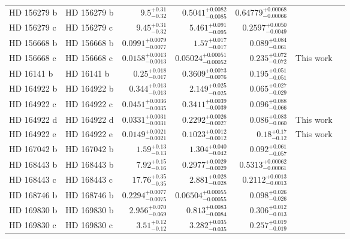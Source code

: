 \begin{longtable*}{llrrrrr}
HD 156279 b & HD 156279 b & $9.5^{+0.31}_{-0.32}$ & $0.5041^{+0.0082}_{-0.0085}$ & $0.64779^{+0.00068}_{-0.00066}$ & \cite{Diaz12} & \\ 
HD 156279 c & HD 156279 c & $9.45^{+0.31}_{-0.32}$ & $5.461^{+0.091}_{-0.095}$ & $0.2597^{+0.0050}_{-0.0049}$ & \cite{Bryan16} & \\ 
HD 156668 b & HD 156668 b & $0.0991^{+0.0079}_{-0.0077}$ & $1.57^{+0.017}_{-0.017}$ & $0.089^{+0.084}_{-0.061}$ & \cite{Howard11} & \\ 
HD 156668 c & HD 156668 c & $0.0158^{+0.0013}_{-0.0013}$ & $0.05024^{+0.00051}_{-0.00052}$ & $0.235^{+0.072}_{-0.072}$ & This work & \\ 
HD 16141 b & HD 16141 b & $0.25^{+0.018}_{-0.017}$ & $0.3609^{+0.0073}_{-0.0076}$ & $0.195^{+0.051}_{-0.051}$ & \cite{Butler06} & \\ 
HD 164922 b & HD 164922 b & $0.344^{+0.013}_{-0.013}$ & $2.149^{+0.025}_{-0.025}$ & $0.065^{+0.027}_{-0.029}$ & \cite{Butler06} & \\ 
HD 164922 c & HD 164922 c & $0.0451^{+0.0036}_{-0.0035}$ & $0.3411^{+0.0039}_{-0.0039}$ & $0.096^{+0.088}_{-0.066}$ & \cite{Fulton16} & \\ 
HD 164922 d & HD 164922 d & $0.0331^{+0.0031}_{-0.0031}$ & $0.2292^{+0.0026}_{-0.0027}$ & $0.086^{+0.083}_{-0.060}$ & This work & \\ 
HD 164922 e & HD 164922 e & $0.0149^{+0.0021}_{-0.0021}$ & $0.1023^{+0.0012}_{-0.0012}$ & $0.18^{+0.17}_{-0.12}$ & This work & \\ 
HD 167042 b & HD 167042 b & $1.59^{+0.13}_{-0.13}$ & $1.304^{+0.040}_{-0.042}$ & $0.092^{+0.061}_{-0.057}$ & \cite{Johnson08} & \\ 
HD 168443 b & HD 168443 b & $7.92^{+0.15}_{-0.16}$ & $0.2977^{+0.0029}_{-0.0029}$ & $0.5313^{+0.00062}_{-0.00061}$ & \cite{Wittenmyer07} & \\ 
HD 168443 c & HD 168443 c & $17.76^{+0.35}_{-0.35}$ & $2.881^{+0.028}_{-0.028}$ & $0.2112^{+0.0013}_{-0.0013}$ & \cite{Wittenmyer07} & \\ 
HD 168746 b & HD 168746 b & $0.2294^{+0.0077}_{-0.0075}$ & $0.06504^{+0.00055}_{-0.00055}$ & $0.098^{+0.026}_{-0.026}$ & \cite{Pepe02} & \\ 
HD 169830 b & HD 169830 b & $2.956^{+0.070}_{-0.069}$ & $0.813^{+0.0083}_{-0.0084}$ & $0.306^{+0.012}_{-0.013}$ & \cite{Naef01} & \\ 
HD 169830 c & HD 169830 c & $3.51^{+0.12}_{-0.12}$ & $3.282^{+0.035}_{-0.035}$ & $0.257^{+0.019}_{-0.019}$ & \cite{Mayor04} & \\ 

\end{longtable*}
